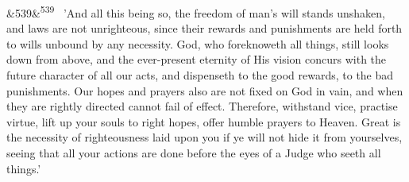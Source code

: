 \documentclass[12pt]{article}
\newcommand{\para}[1][]{\par\noindent\ifx&#1&\else\textsuperscript{\footnotesize #1}~\fi}
\begin{document}
\para[539] 'And all this being so, the freedom of man's will stands unshaken, and laws are not unrighteous, since their rewards and punishments are held forth to wills unbound by any necessity. God, who foreknoweth all things, still looks down from above, and the ever-present eternity of His vision concurs with the future character of all our acts, and dispenseth to the good rewards, to the bad punishments. Our hopes and prayers also are not fixed on God in vain, and when they are rightly directed cannot fail of effect. Therefore, withstand vice, practise virtue, lift up your souls to right hopes, offer humble prayers to Heaven. Great is the necessity of righteousness laid upon you if ye will not hide it from yourselves, seeing that all your actions are done before the eyes of a Judge who seeth all things.'
\end{document}
